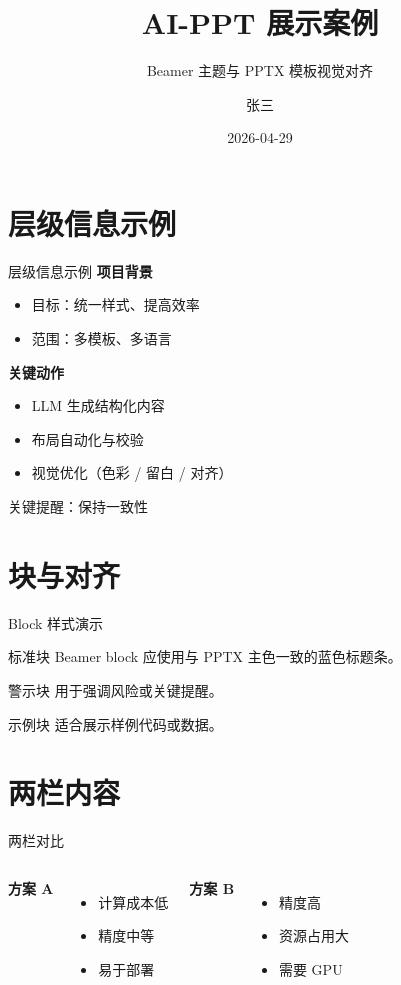 \documentclass[aspectratio=169]{ctexbeamer}
\title{AI-PPT 展示案例}
\subtitle{Beamer 主题与 PPTX 模板视觉对齐}
\author{张三}
\institute{中国科学院等离子体物理研究所}
\date{2026-04-29}
\begin{document}

\section{层级信息示例}

\begin{frame}{层级信息示例}
  \textbf{项目背景}
  \begin{itemize}
    \item 目标：统一样式、提高效率
    \item 范围：多模板、多语言
  \end{itemize}
  \textbf{关键动作}
  \begin{itemize}
    \item LLM 生成结构化内容
    \item 布局自动化与校验
    \item 视觉优化（色彩 / 留白 / 对齐）
  \end{itemize}
  \alert{关键提醒：保持一致性}
\end{frame}

\section{块与对齐}

\begin{frame}{Block 样式演示}
  \begin{block}{标准块}
    Beamer block 应使用与 PPTX 主色一致的蓝色标题条。
  \end{block}
  \begin{alertblock}{警示块}
    用于强调风险或关键提醒。
  \end{alertblock}
  \begin{exampleblock}{示例块}
    适合展示样例代码或数据。
  \end{exampleblock}
\end{frame}

\section{两栏内容}

\begin{frame}{两栏对比}
  \begin{columns}[T]
      \textbf{方案 A}
      \begin{itemize}
        \item 计算成本低
        \item 精度中等
        \item 易于部署
      \end{itemize}
      \textbf{方案 B}
      \begin{itemize}
        \item 精度高
        \item 资源占用大
        \item 需要 GPU
      \end{itemize}
  \end{columns}
\end{frame}

\end{document}

